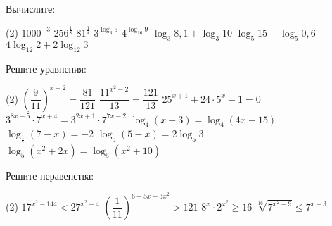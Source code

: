 \begin{exam}
	\begin{listofex}
		\item Вычислите:
		\begin{tasks}(2)
			\task \( 1000^{-3} \)
			\task \( 256^{\tfrac{1}{8}} \)
			\task \( 81^{\tfrac{1}{4}} \)
			\task \( 3^{\log_3 5} \)
			\task \( 4^{\log_{16} 9} \)
			\task \( \log_3 8,1 + \log_3 10 \)
			\task \( \log_5 15 - \log_5 0,6 \)
			\task \( 4\log_{12} 2 + 2\log_{12} 3 \)
			
			
		\end{tasks}
		\item Решите уравнения: %
		\begin{tasks}(2)
			\task \( \left(\dfrac{ 9 }{ 11}\right)^{x-2}=\dfrac{ 81 }{121} \)
			\task \( \dfrac{ 11^{x^2-2} }{ 13 }=\dfrac{ 121 }{ 13 } \)
			\task \( 25^{x+1}+24 \cdot 5^x -1=0 \)
			\task \( 3^{8x-5} \cdot 7^{x+4}=3^{2x+1} \cdot 7^{7x-2} \)
			\task \( \log_4 (x+3) = \log_4 (4x-15) \)
			\task \( \log_{\tfrac{1}{7}}(7-x) = -2 \)
			\task \( \log_5 (5-x) = 2 \log_5 3 \)
			\task \( \log_5 (x^2+2x) = \log_5 (x^2+10) \)
		\end{tasks}
		\item Решите неравенства: %
		\begin{tasks}(2)
			\task \( 17^{x^2-144}<27^{x^2-4} \)
			\task \( \left( \dfrac{ 1 }{ 11 } \right)^{6+5x-3x^2} >121 \)
			\task \( 8^x \cdot 2^{x^2} \ge 16 \)
			\task \( \sqrt[16]{7^{x^2-9}}\le 7^{x-3} \)
		\end{tasks}
	\end{listofex}
\end{exam}
